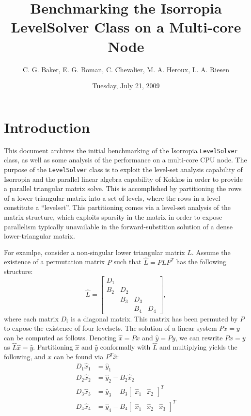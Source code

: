 \documentclass[12pt]{article}
\begin{document}
\title{Benchmarking the Isorropia LevelSolver Class on a Multi-core Node}
\author{C. G. Baker, E. G. Boman, C. Chevalier, M. A. Heroux, L. A. Riesen}
\date{Tuesday, July 21, 2009}
\maketitle

\section{Introduction}

This document archives the initial benchmarking of the Isorropia \texttt{LevelSolver} class, as well as some analysis of the performance on a multi-core CPU node. The purpose of the \texttt{LevelSolver} class is to exploit the level-set analysis capability of Isorropia and the parallel linear algebra capability of Kokkos in order to provide a parallel triangular matrix solve. This is accomplished by partitioning the rows of a lower triangular matrix into a set of levels, where the rows in a level constitute a ``levelset''. This partitioning comes via a level-set analysis of the matrix structure, which exploits sparsity in the matrix in order to expose parallelism typically unavailable in the forward-substition solution of a dense lower-triangular matrix.

For examlpe, consider a non-singular lower triangular matrix $L$. Assume the existence of a permutation matrix $P$ such that $\hat{L} = P L P^T$ has the following structure:
\[
\hat{L} = \begin{bmatrix} D_1    &               &             & \\
                     B_2 & D_2     &             & \\
                      & B_3 & D_3     & \\
                      &  & B_4  & D_4
       \end{bmatrix}, 
\]
where each matrix $D_i$ is a diagonal matrix. This matrix has been permuted by $P$ to expose the existence of four levelsets. The solution of a linear system $P x = y$ can be computed as follows. Denoting $\hat{x} = P x$ and $\hat{y} = P y$, we can rewrite $P x = y$ as $\hat{L} \hat{x} = \hat{y}$. Partitioning $\hat{x}$ and $\hat{y}$ conformally with $\hat{L}$ and multiplying yields the following, and $x$ can be found via $P^T \hat{x}$:
\begin{align*}
D_1 \hat{x}_1 &= \hat{y}_1 \\
D_2 \hat{x}_2 &=  \hat{y}_2 - B_2 \hat{x}_2 \\
D_3 \hat{x}_3 &= \hat{y}_3 - B_3 \begin{bmatrix} \hat{x}_1 & \hat{x}_2 \end{bmatrix}^T \\
D_4 \hat{x}_4 &= \hat{y}_4 - B_4 \begin{bmatrix} \hat{x}_1 & \hat{x}_2 & \hat{x}_3 \end{bmatrix}^T 
\end{align*}
\end{document}
